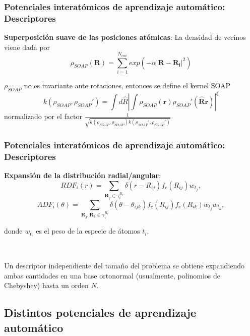 \documentclass[aspectratio=169]{beamer}
\let\oldtextbf\textbf
\renewcommand{\textbf}[1]{\textcolor{nordblue}{\oldtextbf{#1}}}
\begin{document}
    \begin{frame}
        \frametitle{Potenciales interatómicos de aprendizaje automático: Descriptores}

        \textbf{Superposición suave de las posiciones atómicas}: La densidad
        de vecinos viene dada por
        $$
        \rho_{SOAP}(\mathbf{R}) = \sum_{i=1}^{N_{env}} exp(-\alpha |\mathbf{R} - \mathbf{R_i}|^2)
        $$

        \pause

        $\rho_{SOAP}$ no es invariante ante rotaciones, entonces se define el 
        kernel SOAP
        $$
        k(\rho_{SOAP}, \rho_{SOAP}') = \int d\hat{R} \left|\int \rho_{SOAP}(\mathbf{r}) \rho_{SOAP}'(\mathbf{\hat{R}r})\right|^{\xi}
        $$
        normalizado por el factor $\frac{1}{\sqrt{k(\rho_{SOAP}, \rho_{SOAP}) k(\rho_{SOAP}', \rho_{SOAP}')}}$

    \end{frame}

    \begin{frame}
        \frametitle{Potenciales interatómicos de aprendizaje automático: Descriptores}

        \textbf{Expansión de la distribución radial/angular}:
        $$
        RDF_i(r) = \sum_{\mathbf{R}_j \in \gamma_i^{R_c}} \delta(r - R_{ij}) f_c(R_{ij}) w_{t_j},
        $$
        $$
        ADF_i(\theta) = \sum_{\mathbf{R}_j, \mathbf{R}_k \in \gamma_i^{R_c}} \delta(\theta - \theta_{ijk}) f_c(R_{ij}) f_c(R_{ik}) w_{t_j} w_{t_k},
        $$

        donde $w_{t_i}$ es el peso de la especie de átomos $t_i$.
        
        \ \pause

        Un descriptor independiente del tamaño del problema se obtiene expandiendo
        ambas cantidades en una base ortonormal (usualmente, polinomios de 
        Chebyshev) hasta un orden $N$.

    \end{frame}
    
    \subsection{Distintos potenciales de aprendizaje automático}
\end{document}
